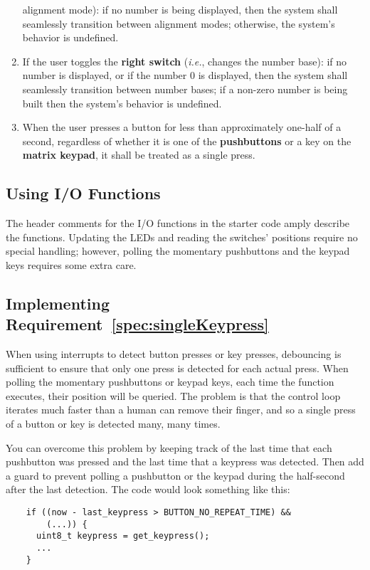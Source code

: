 \begin{enumerate}
    alignment mode): if no number is being displayed, then the system shall
    seamlessly transition between alignment modes; otherwise, the system's
    behavior is undefined.
\item If the user toggles the \textbf{right switch} (\textit{i.e.}, changes
    the number base): if no number is displayed, or if the number 0 is displayed,
    then the system shall seamlessly transition between number bases; if a
    non-zero number is being built then the system's behavior is undefined.
\item \label{spec:singleKeypress} When the user presses a button for less than
    approximately one-half of a second, regardless of whether it is one of the
    \textbf{pushbuttons} or a key on the \textbf{matrix keypad}, it shall be treated
    as a single press.
\end{enumerate}


\subsection{Using I/O Functions}

The header comments for the I/O functions in the starter code amply describe the functions.
Updating the LEDs and reading the switches' positions require no special handling;
however, polling the momentary pushbuttons and the keypad keys requires some extra care.

\subsection{Implementing Requirement~\ref{spec:singleKeypress}}

When using interrupts to detect button presses or key presses, debouncing is sufficient to ensure that only one press is detected for each actual press.
When polling the momentary pushbuttons or keypad keys, each time the  function executes, their position will be queried.
The problem is that the control loop iterates much faster than a human can remove their finger, and so a single press of a button or key is detected many, many times.

You can overcome this problem by keeping track of the last time that each pushbutton was pressed and the last time that a keypress was detected.
Then add a guard to prevent polling a pushbutton or the keypad during the half-second after the last detection.
The code would look something like this:

\begin{lstlisting}
    if ((now - last_keypress > BUTTON_NO_REPEAT_TIME) &&
        (...)) {
      uint8_t keypress = get_keypress();
      ...
    }
\end{lstlisting}



